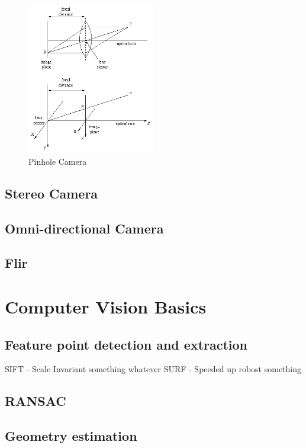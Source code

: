 \begin{figure}[h!]
  \caption{Pinhole Camera}
  \centering
    \includegraphics[width=0.5\textwidth]{chapters/images/pinhole_camera}
\end{figure}

\subsection{Stereo Camera}

\subsection{Omni-directional Camera}

\subsection{Flir}

\section{Computer Vision Basics}

\subsection{Feature point detection and extraction}

SIFT - Scale Invariant something whatever
SURF - Speeded up robost something

\subsection{RANSAC}

\subsection{Geometry estimation}

